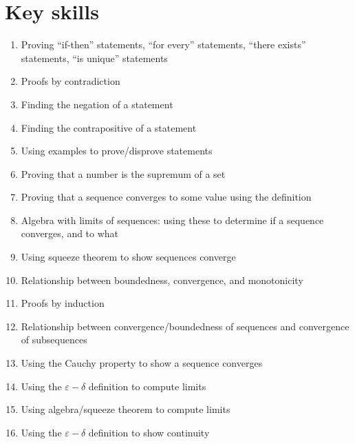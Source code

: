 \documentclass[12pt]{amsart}
\newcommand{\e}{\varepsilon}
\renewcommand{\d}{\delta}
\begin{document}
\section*{Key skills}

\begin{enumerate}
	\item Proving ``if-then'' statements, ``for every'' statements, ``there exists'' statements, ``is unique'' statements
	\item Proofs by contradiction
	\item Finding the negation of a statement
	\item Finding the contrapositive of a statement
	\item Using examples to prove/disprove statements
	\item Proving that a number is the supremum of a set

	\item Proving that a sequence converges to some value using the definition
		\item Algebra with limits of sequences: using these to determine if a sequence converges, and to what
	\item Using squeeze theorem to show sequences converge


	\item Relationship between boundedness, convergence, and monotonicity
		\item Proofs by induction

	\item Relationship between convergence/boundedness of sequences and convergence of subsequences
	\item Using the Cauchy property to show a sequence converges

	\item Using the $\e-\d$ definition to compute limits
						
	\item Using algebra/squeeze theorem to compute limits

	\item Using the $\e-\d$ definition to show continuity
		\begin{comment}
	\item Using algebra/compositions to show continuity
	\item Applying the $\e-\d$ definitions of limits and continuity 
	\item Applying the Intermediate Value Theorem
		\item Applying Boundedness and Extreme Value Theorems
	\item Evaluating derivatives by definition
	\item Evaluating derivatives by algebra and chain rule
	\item Using definition of derivative and Min-Max Theorem to determine when values of $f$ are larger / smaller than others
	\item Using definition of derivative and mean value theorem to determine increasing / decreasing behavior of functions
\end{comment}
\end{enumerate}
\end{document}
